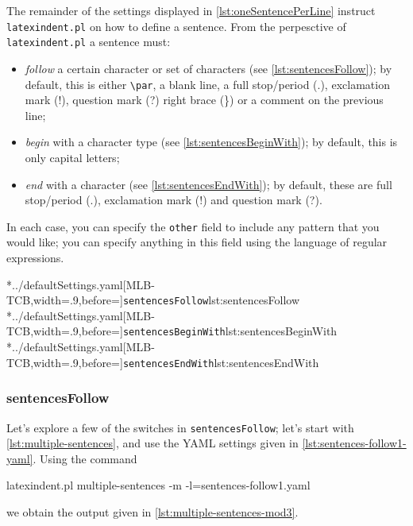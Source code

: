 	The remainder of the settings displayed in \vref{lst:oneSentencePerLine} instruct
	\texttt{latexindent.pl} on how to define a sentence. From the perpesctive of
	\texttt{latexindent.pl} a sentence must:
	\begin{itemize}
		\item \emph{follow} a certain character or set of characters (see
		      \cref{lst:sentencesFollow}); by default, this is either \lstinline!\par!, a
		      blank line, a full stop/period (.), exclamation mark (!), question mark (?) right brace
		      (\}) or a comment on the previous line;
		\item \emph{begin} with a character type (see \cref{lst:sentencesBeginWith}); by
		      default, this is only capital letters;
		\item \emph{end} with a character (see \cref{lst:sentencesEndWith}); by
		      default, these are full stop/period (.), exclamation mark (!) and question mark (?).
	\end{itemize}
	In each case, you can specify the \texttt{other} field to include any
	pattern that you would like; you can specify anything in this field using the language of
	regular expressions.

	\begin{cmhtcbraster}[raster columns=3,
			raster left skip=-3.5cm,
			raster right skip=-2cm,
			raster column skip=.06\linewidth]
		\cmhlistingsfromfile[style=sentencesFollow]*{../defaultSettings.yaml}[MLB-TCB,width=.9\linewidth,before=\centering]{\texttt{sentencesFollow}}{lst:sentencesFollow}
		\cmhlistingsfromfile[style=sentencesBeginWith]*{../defaultSettings.yaml}[MLB-TCB,width=.9\linewidth,before=\centering]{\texttt{sentencesBeginWith}}{lst:sentencesBeginWith}
		\cmhlistingsfromfile[style=sentencesEndWith]*{../defaultSettings.yaml}[MLB-TCB,width=.9\linewidth,before=\centering]{\texttt{sentencesEndWith}}{lst:sentencesEndWith}
	\end{cmhtcbraster}

\subsubsection{sentencesFollow}
	Let's explore a few of the switches in \texttt{sentencesFollow}; let's start with
	\vref{lst:multiple-sentences}, and use the YAML settings given in
	\cref{lst:sentences-follow1-yaml}. Using the command
	\begin{commandshell}
latexindent.pl multiple-sentences -m -l=sentences-follow1.yaml
\end{commandshell}
	we obtain the output given in \cref{lst:multiple-sentences-mod3}.

